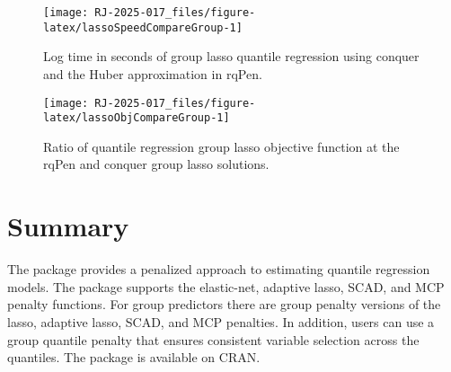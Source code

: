 \begin{figure}

{\centering \texttt{[image: RJ-2025-017\_files/figure-latex/lassoSpeedCompareGroup-1]} 

}

\caption{Log time in seconds of group lasso quantile regression using conquer and the Huber approximation in rqPen.}\label{fig:lassoSpeedCompareGroup}
\end{figure}

\begin{figure}

{\centering \texttt{[image: RJ-2025-017\_files/figure-latex/lassoObjCompareGroup-1]} 

}

\caption{Ratio of quantile regression group lasso objective function at the rqPen and conquer group lasso solutions.}\label{fig:lassoObjCompareGroup}
\end{figure}

\section{Summary}\label{summary}

The  package provides a penalized approach to estimating quantile regression models. The package supports the elastic-net, adaptive lasso, SCAD, and MCP penalty functions. For group predictors there are group penalty versions of the lasso, adaptive lasso, SCAD, and MCP penalties. In addition, users can use a group quantile penalty that ensures consistent variable selection across the quantiles. The package is available on CRAN.

